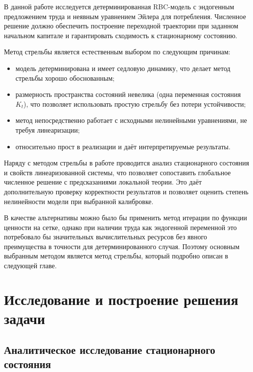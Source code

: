\documentclass[12pt,a4paper]{report}   %
\begin{document}
            В данной работе исследуется детерминированная RBC-модель с эндогенным предложением труда и неявным уравнением Эйлера для потребления. Численное решение должно обеспечить построение переходной траектории при заданном начальном капитале и гарантировать сходимость к стационарному состоянию.

            
            Метод стрельбы является естественным выбором по следующим причинам:
            
            \begin{itemize}
                \item модель детерминирована и имеет седловую динамику, что делает метод стрельбы хорошо обоснованным;
                \item размерность пространства состояний невелика (одна переменная состояния $K_t$), что позволяет использовать простую стрельбу без потери устойчивости;
                \item метод непосредственно работает с исходными нелинейными уравнениями, не требуя линеаризации;
                \item относительно прост в реализации и даёт интерпретируемые результаты.
            \end{itemize}

            Наряду с методом стрельбы в работе проводится анализ стационарного состояния и свойств линеаризованной системы, что позволяет сопоставить глобальное численное решение с предсказаниями локальной теории. Это даёт дополнительную проверку корректности результатов и позволяет оценить степень нелинейности модели при выбранной калибровке.

            В качестве альтернативы можно было бы применить метод итерации по функции ценности на сетке, однако при наличии труда как эндогенной переменной это потребовало бы значительных вычислительных ресурсов без явного преимущества в точности для детерминированного случая. Поэтому основным выбранным методом является метод стрельбы, который подробно описан в следующей главе.

    \chapter{Исследование и построение решения задачи}
        \section{Аналитическое исследование стационарного состояния}
\end{document}
